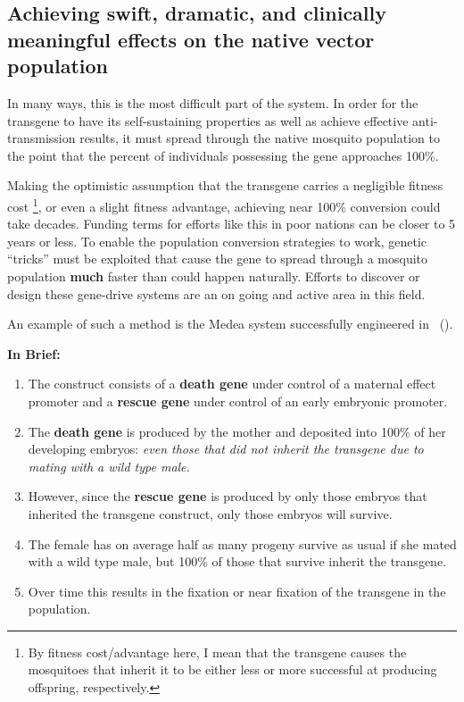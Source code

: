 \subsection{Achieving swift, dramatic, and clinically meaningful effects on the native vector population}

In many ways, this is the most difficult part of the system.
In order for the transgene to have its self-sustaining properties as well as achieve effective anti-transmission results, it must spread through the native mosquito population to the point that the percent of individuals possessing the gene approaches 100\%.

Making the optimistic assumption that the transgene carries a negligible fitness cost
\footnote{By fitness cost/advantage here, I mean that the transgene
    causes the mosquitoes that inherit it to be either less or more
    successful at producing offspring, respectively.},
or even a slight fitness advantage, achieving near 100\% conversion could take decades.
Funding terms for efforts like this in poor nations can be closer to 5 years or less.
To enable the population conversion strategies to work, genetic ``tricks'' must be exploited that cause the gene to spread through a mosquito population \textbf{much} faster than could happen naturally.
Efforts to discover or design these \gls{gene-drive} systems are an on going and active area in this field.

An example of such a method is the Medea system successfully engineered in \Dm\ (\CITEME).

\textbf{In Brief:}
\begin{enumerate}
 \item The construct consists of a \textbf{death gene} under control of a maternal effect promoter and a \textbf{rescue gene} under control of an early embryonic promoter.
 \item The \textbf{death gene} is produced by the mother and deposited into 100\% of her developing embryos: \textit{even those that did not inherit the transgene due to mating with a wild type male.}
 \item However, since the \textbf{rescue gene} is produced by only those embryos that inherited the transgene construct, only those embryos will survive.
 \item The female has on average half as many progeny survive as usual if she mated with a wild type male, but 100\% of those that survive inherit the transgene.
 \item Over time this results in the fixation or near fixation of the transgene in the population.
\end{enumerate}


